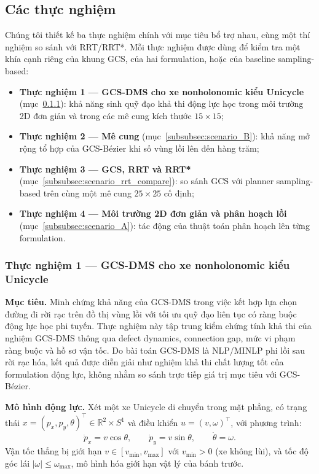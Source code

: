 \subsection{Các thực nghiệm}
\label{subsec:exp_scenarios}

Chúng tôi thiết kế ba thực nghiệm chính với mục tiêu bổ trợ nhau, cùng một thí
nghiệm so sánh với RRT/RRT*. Mỗi thực nghiệm được dùng để kiểm tra một khía
cạnh riêng của khung GCS, của hai formulation, hoặc của baseline sampling-based:
\begin{itemize}
    \item \textbf{Thực nghiệm 1 — GCS-DMS cho xe nonholonomic kiểu Unicycle} (mục~\ref{subsubsec:scenario_C}): khả năng sinh quỹ đạo khả thi động lực học trong môi trường 2D đơn giản và trong các mê cung kích thước $15\times 15$;
    \item \textbf{Thực nghiệm 2 — Mê cung} (mục~\ref{subsubsec:scenario_B}): khả năng mở rộng tổ hợp của GCS-Bézier khi số vùng lồi lên đến hàng trăm;
    \item \textbf{Thực nghiệm 3 — GCS, RRT và RRT*} (mục~\ref{subsubsec:scenario_rrt_compare}): so sánh GCS với planner sampling-based trên cùng một mê cung $25\times 25$ cố định;
    \item \textbf{Thực nghiệm 4 — Môi trường 2D đơn giản và phân hoạch lồi} (mục~\ref{subsubsec:scenario_A}): tác động của thuật toán phân hoạch lên từng formulation.
\end{itemize}

\subsubsection{Thực nghiệm 1 — GCS-DMS cho xe nonholonomic kiểu Unicycle}

\label{subsubsec:scenario_C}

\textbf{Mục tiêu.}
Minh chứng khả năng của GCS-DMS trong việc kết hợp lựa chọn đường đi rời rạc trên đồ thị vùng lồi với tối ưu quỹ đạo liên tục có ràng buộc động lực học phi tuyến. Thực nghiệm này tập trung kiểm chứng tính khả thi của nghiệm GCS-DMS thông qua defect dynamics, connection gap, mức vi phạm ràng buộc và hồ sơ vận tốc. Do bài toán GCS-DMS là NLP/MINLP phi lồi sau rời rạc hóa, kết quả được diễn giải như nghiệm khả thi chất lượng tốt của formulation động lực, không nhằm so sánh trực tiếp giá trị mục tiêu với GCS-Bézier.

\textbf{Mô hình động lực.}
Xét một xe Unicycle di chuyển trong mặt phẳng, có trạng thái $x = (p_x, p_y, \theta)^\top \in \mathbb{R}^2 \times S^1$ và điều khiển $u = (v, \omega)^\top$, với phương trình:
\begin{equation}
    \dot p_x = v\cos\theta,
    \qquad
    \dot p_y = v\sin\theta,
    \qquad
    \dot\theta = \omega.
    \label{eq:Unicycle_dyn}
\end{equation}
Vận tốc thẳng bị giới hạn $v \in [v_{\min}, v_{\max}]$ với $v_{\min}>0$ (xe không lùi), và tốc độ góc lái $|\omega| \le \omega_{\max}$, mô hình hóa giới hạn vật lý của bánh trước.

